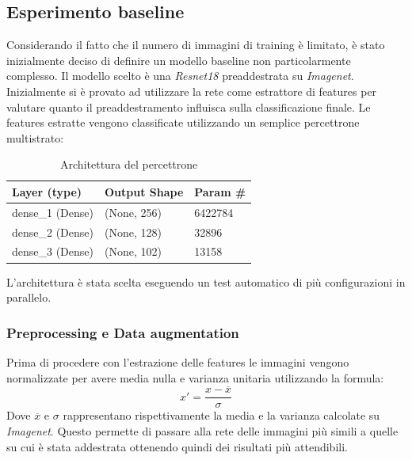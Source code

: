 \subsection{Esperimento baseline}
Considerando il fatto che il numero di immagini di training è limitato, è stato inizialmente deciso di definire un modello baseline non particolarmente complesso. Il modello scelto è una \textit{Resnet18} \cite{he2015deep} preaddestrata su \textit{Imagenet}. Inizialmente si è provato ad utilizzare la rete come estrattore di features per valutare quanto il preaddestramento influisca sulla classificazione finale. 
Le features estratte vengono classificate utilizzando un semplice percettrone multistrato:
\begin{table}[H]
\centering
\caption{Architettura del percettrone}
\begin{tabular}{lll}
\hline
Layer (type)     & Output Shape & Param \# \\ \hline
dense\_1 (Dense) & (None, 256)  & 6422784  \\ \hline
dense\_2 (Dense) & (None, 128)  & 32896    \\ \hline
dense\_3 (Dense) & (None, 102)  & 13158    \\ \hline
\end{tabular}
\label{t_mlp}
\end{table}
L'architettura è stata scelta eseguendo un test automatico di più configurazioni in parallelo.

\subsubsection{Preprocessing e Data augmentation}
Prima di procedere con l'estrazione delle features le immagini vengono normalizzate per avere media nulla e varianza unitaria utilizzando la formula:
\begin{equation}
x' = \frac{x - \overline{x}}{\sigma}
\end{equation}
Dove $ \overline{x} $ e $ \sigma $ rappresentano rispettivamente la media e la varianza calcolate su \textit{Imagenet}.
Questo permette di passare alla rete delle immagini più simili a quelle su cui è stata addestrata ottenendo quindi dei risultati più attendibili.
